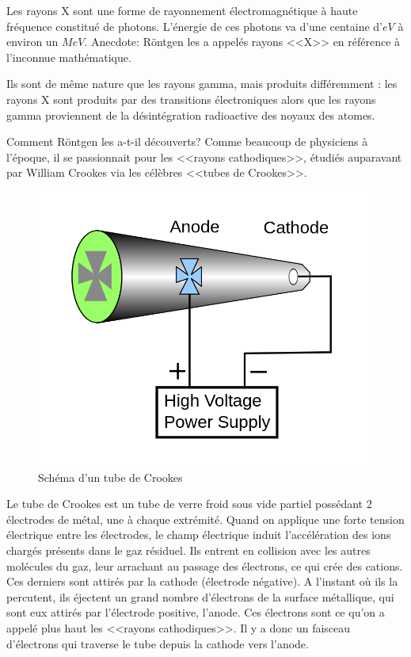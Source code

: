 Les rayons X sont une forme de rayonnement électromagnétique à haute fréquence constitué de photons. L'énergie de ces photons va d'une centaine d'$eV$ à environ un $MeV$. Anecdote: Röntgen les a appelés rayons <<X>> en référence à l'inconnue mathématique. 

Ils sont de même nature que les rayons gamma, mais produits différemment : les rayons X sont produits par des transitions électroniques alors que les rayons gamma proviennent de la désintégration radioactive des noyaux des atomes.

Comment Röntgen les a-t-il découverts? Comme beaucoup de physiciens à l'époque, il se passionnait pour les <<rayons cathodiques>>, étudiés auparavant par William Crookes via les célèbres <<tubes de Crookes>>.

\begin{figure}[ht]
    \centering
    \includegraphics[scale=0.20]{Images1/tubecrookes.png}
    \caption{Schéma d'un tube de Crookes}
\end{figure}

Le tube de Crookes est un tube de verre froid sous vide partiel possédant 2 électrodes de métal, une à chaque extrémité. Quand on applique une forte tension électrique entre les électrodes, le champ électrique induit l'accélération des ions chargés présents dans le gaz résiduel. Ils entrent en collision avec les autres molécules du gaz, leur arrachant au passage des électrons, ce qui crée des cations. Ces derniers sont attirés par la cathode (électrode négative). A l'instant où ils la percutent, ils éjectent un grand nombre d'électrons de la surface métallique, qui sont eux attirés par l'électrode positive, l'anode. Ces électrons sont ce qu'on a appelé plus haut les <<rayons cathodiques>>. Il y a donc un faisceau d'électrons qui traverse le tube depuis la cathode vers l'anode.

